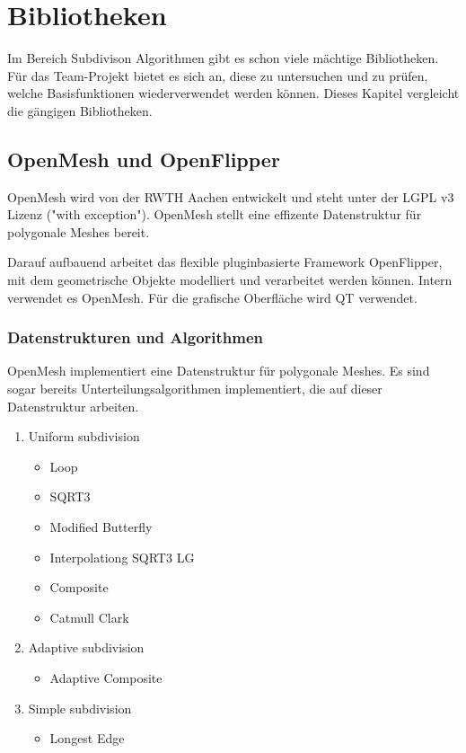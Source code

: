 \chapter{Bibliotheken}

Im Bereich Subdivison Algorithmen gibt es schon viele mächtige Bibliotheken.
Für das Team-Projekt bietet es sich an, diese zu untersuchen und zu prüfen, welche Basisfunktionen wiederverwendet werden können.
Dieses Kapitel vergleicht die gängigen Bibliotheken.


\section{OpenMesh und OpenFlipper}

OpenMesh wird von der \acs{RWTH} Aachen entwickelt und steht unter der \acs{LGPL} v3 Lizenz ("with exception"). OpenMesh stellt eine effizente Datenstruktur für polygonale Meshes bereit.

Darauf aufbauend arbeitet das flexible pluginbasierte Framework OpenFlipper, mit dem geometrische Objekte modelliert und verarbeitet werden können. Intern verwendet es OpenMesh. Für die grafische Oberfläche wird QT verwendet.

\subsection{Datenstrukturen und Algorithmen}

OpenMesh implementiert eine Datenstruktur für polygonale Meshes. Es sind sogar bereits Unterteilungsalgorithmen implementiert, die auf dieser Datenstruktur arbeiten.

\begin{enumerate}
\item Uniform subdivision
\begin{itemize}
	\item Loop
	\item SQRT3
	\item Modified Butterfly
	\item Interpolationg SQRT3 LG
	\item Composite
	\item Catmull Clark
\end{itemize}
\item Adaptive subdivision
\begin{itemize}
	\item Adaptive Composite
\end{itemize}
\item Simple subdivision
\begin{itemize}
	\item Longest Edge
\end{itemize}
\end{enumerate}


